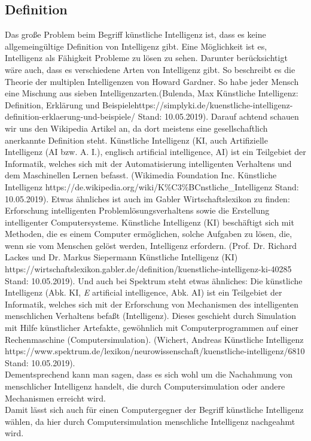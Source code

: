 \documentclass[12pt,a4paper]{article}
\begin{document}
	\subsection{Definition}
	Das große Problem beim Begriff künstliche Intelligenz ist, dass es keine allgemeingültige Definition von Intelligenz gibt. Eine Möglichkeit ist es, Intelligenz als Fähigkeit Probleme zu lösen zu sehen. Darunter berücksichtigt wäre auch, dass es verschiedene Arten von Intelligenz gibt. So beschreibt es die \glqq Theorie der multiplen Intelligenzen\grqq{} von Howard Gardner. So habe jeder Mensch eine Mischung aus sieben Intelligenzarten.(Bulenda, Max \glqq Künstliche Intelligenz: Definition, Erklärung und Beispiele\grqq{}https://simplyki.de/kuenstliche-intelligenz-definition-erklaerung-und-beispiele/ Stand: 10.05.2019).
	Darauf achtend schauen wir uns den Wikipedia Artikel an, da dort meistens eine gesellschaftlich anerkannte Definition steht. \glqq Künstliche Intelligenz (KI, auch Artifizielle Intelligenz (AI bzw. A. I.), englisch artificial intelligence, AI) ist ein Teilgebiet der Informatik, welches sich mit der Automatisierung intelligenten Verhaltens und dem Maschinellen Lernen befasst.\grqq{} (Wikimedia Foundation Inc. \glqq Künstliche Intelligenz\grqq{} https://de.wikipedia.org/wiki/K\%C3\%BCnstliche\_Intelligenz Stand: 10.05.2019).
	Etwas ähnliches  ist auch im Gabler Wirtschaftslexikon zu finden: \glqq Erforschung intelligenten Problemlösungsverhaltens sowie die Erstellung intelligenter Computersysteme. Künstliche Intelligenz (KI) beschäftigt sich mit Methoden, die es einem Computer ermöglichen, solche Aufgaben zu lösen, die, wenn sie vom Menschen gelöst werden, Intelligenz erfordern.\grqq{} (Prof. Dr. Richard Lackes und Dr. Markus Siepermann \glqq Künstliche Intelligenz (KI)\grqq{} https://wirtschaftslexikon.gabler.de/definition/kuenstliche-intelligenz-ki-40285 Stand: 10.05.2019).
	Und auch bei Spektrum steht etwas ähnliches: \glqq Die künstliche Intelligenz (Abk. KI, \textit{E} artificial intelligence, Abk. AI) ist ein Teilgebiet der Informatik, welches sich mit der Erforschung von Mechanismen des intelligenten menschlichen Verhaltens befaßt (Intelligenz). Dieses geschieht durch Simulation mit Hilfe künstlicher Artefakte, gewöhnlich mit Computerprogrammen auf einer Rechenmaschine (Computersimulation).\grqq{} (Wichert, Andreas \glqq Künstliche Intelligenz\grqq{} https://www.spektrum.de/lexikon/neurowissenschaft/kuenstliche-intelligenz/6810 Stand: 10.05.2019).\\
	Dementsprechend kann man sagen, dass es sich wohl um die Nachahmung von menschlicher Intelligenz handelt, die durch Computersimulation oder andere Mechanismen erreicht wird.\\
	Damit lässt sich auch für einen Computergegner der Begriff künstliche Intelligenz wählen, da hier durch Computersimulation menschliche Intelligenz nachgeahmt wird.
\end{document}
